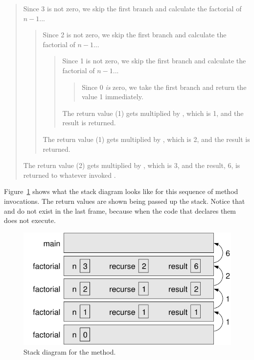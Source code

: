 \vspace{-1ex}
\begin{quote}
Since 3 is not zero, we skip the first branch and calculate the factorial of $n-1$...
\begin{quote}
Since 2 is not zero, we skip the first branch and calculate the factorial of $n-1$...
\begin{quote}
Since 1 is not zero, we skip the first branch and calculate the factorial of $n-1$...
\begin{quote}
Since 0 {\em is} zero, we take the first branch and return the value 1 immediately.
\end{quote}
The return value (1) gets multiplied by , which is 1, and the result is returned.
\end{quote}
The return value (1) gets multiplied by , which is 2, and the result is returned.
\end{quote}
The return value (2) gets multiplied by , which is 3, and the result, 6, is returned to whatever invoked .
\end{quote}
\vspace{-1ex}


Figure~\ref{fig.stack3} shows what the stack diagram looks like for this sequence of method invocations.
The return values are shown being passed up the stack.
Notice that  and  do not exist in the last frame, because when  the code that declares them does not execute.

\begin{figure}[!ht]
\begin{center}
\includegraphics{figs/stack3.pdf}
\caption{Stack diagram for the  method.}
\label{fig.stack3}
\end{center}
\end{figure}


